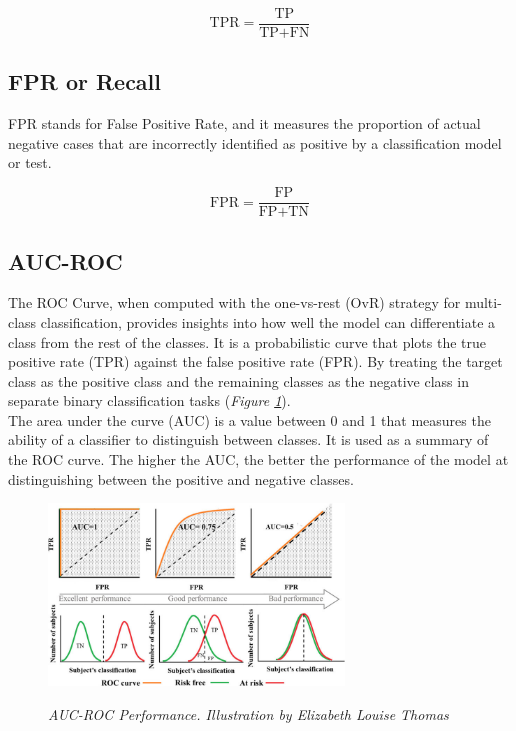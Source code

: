 \[
  \text{TPR} = \frac{\text{TP}}{\text{TP} + \text{FN}}
\]

\subsection{FPR or Recall}

FPR stands for False Positive Rate, and it measures the proportion of actual
negative cases that are incorrectly identified as positive by a classification
model or test.

\[ \text{FPR} = \frac{\text{FP}}{\text{FP} + \text{TN}} \]

\subsection{AUC-ROC}

The ROC Curve, when computed with the one-vs-rest (OvR) strategy for
multi-class classification, provides insights into how well the model can
differentiate a class from the rest of the classes. It is a probabilistic curve
that plots the true positive rate (TPR) against the false positive rate (FPR).
By treating the target class as the positive class and the remaining classes as
the negative class in separate binary classification tasks (\textit{Figure
\ref{fig:auc-roc}}). \\

The area under the curve (AUC) is a value between 0 and 1 that measures the
ability of a classifier to distinguish between classes. It is used as a summary
of the ROC curve. The higher the AUC, the better the performance of the model
at distinguishing between the positive and negative classes.

\begin{figure}[H]
  \centering
  \includegraphics[width=0.7\textwidth]{imatges/preliminaries/auc.png}
  \caption[AUC-ROC Performance]{\textit{AUC-ROC Performance. Illustration by Elizabeth Louise Thomas}}
  {\label{fig:auc-roc}}
\end{figure}

